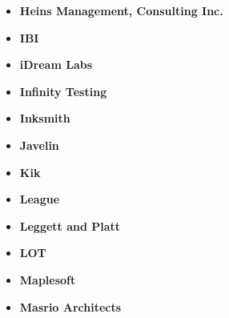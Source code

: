 \documentclass[main.tex]{subfiles}
\begin{document}
\begin{multicols}{3}
\begin{itemize}[label={},noitemsep]
    \item \textbf{Heins Management, Consulting Inc.}
    \end{itemize}
    \columnbreak
    \begin{itemize}[label={},noitemsep]
    \item \textbf{IBI}
    \end{itemize}
    \columnbreak
    \begin{itemize}[label={},noitemsep]
    \item \textbf{iDream Labs}
    \end{itemize}
    \columnbreak
\end{multicols}

\begin{multicols}{3}
\begin{itemize}[label={},noitemsep]
    \item \textbf{Infinity Testing}
    \end{itemize}
    \columnbreak
    \begin{itemize}[label={},noitemsep]
    \item \textbf{Inksmith}
    \end{itemize}
    \columnbreak
    \begin{itemize}[label={},noitemsep]
    \item \textbf{Javelin}
    \end{itemize}
    \columnbreak
\end{multicols}

\begin{multicols}{3}
\begin{itemize}[label={},noitemsep]
    \item \textbf{Kik}
    \end{itemize}
    \columnbreak
    \begin{itemize}[label={},noitemsep]
    \item \textbf{League}
    \end{itemize}
    \columnbreak
    \begin{itemize}[label={},noitemsep]
    \item \textbf{Leggett and Platt}
    \end{itemize}
    \columnbreak
\end{multicols}

\begin{multicols}{3}
\begin{itemize}[label={},noitemsep]
    \item \textbf{LOT}
    \end{itemize}
    \columnbreak
    \begin{itemize}[label={},noitemsep]
    \item \textbf{Maplesoft}
    \end{itemize}
    \columnbreak
    \begin{itemize}[label={},noitemsep]
    \item \textbf{Masrio Architects}
    \end{itemize}
    \columnbreak
\end{multicols}
\end{document}
